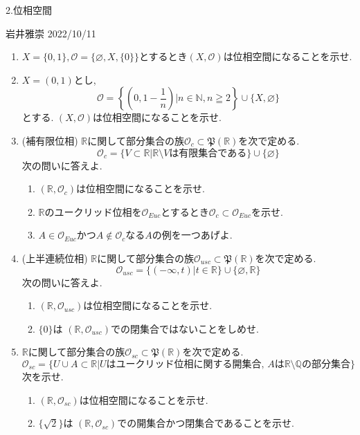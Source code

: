 \documentclass[dvipdfmx,a4paper,11pt]{article}
\newcommand{\R}{\mathbb{R}}
\newcommand{\Q}{\mathbb{Q}}
\newcommand{\N}{\mathbb{N}}
\theoremstyle{definition}
\begin{document}



\begin{center}
{\Large 2.位相空間}
\end{center}

\begin{flushright}
 岩井雅崇 2022/10/11
\end{flushright}
\begin{enumerate}[ label=\textbf{問}2.\arabic*]
\item $X = \{ 0,1\}, \mathscr{O} = \{ \varnothing, X, \{0\} \}$とするとき$(X, \mathscr{O})$は位相空間になることを示せ.

\item $X = (0,1)$とし, 
$$
\mathscr{O} = \left\{ \left(0,1 - \frac{1}{n}\right)| n \in \N, n \geqq 2 \right\} \cup \{ X,\varnothing \}
$$
とする. $(X, \mathscr{O})$は位相空間になることを示せ.

\item (補有限位相)
$\R$に関して部分集合の族$\mathscr{O}_c \subset \mathfrak{P}(\R)$を次で定める.
$$
\mathscr{O}_c = \{V \subset \R | \text{$\R \setminus V$は有限集合である} \} \cup \{  \varnothing  \}
$$
次の問いに答えよ.
	\begin{enumerate}
	\item $(\R,\mathscr{O}_c)$は位相空間になることを示せ.
	\item $\R$のユークリッド位相を$\mathscr{O}_{Euc}$とするとき$\mathscr{O}_c  \subset \mathscr{O}_{Euc}$を示せ. 
	\item $A \in \mathscr{O}_{Euc}$かつ$A \not \in \mathscr{O}_c$なる$A$の例を一つあげよ.
	\end{enumerate}
	
\item (上半連続位相) $\R$に関して部分集合の族$\mathscr{O}_{usc} \subset \mathfrak{P}(\R)$を次で定める.
$$
\mathscr{O}_{usc} = \{(- \infty,t) | t \in \R \} \cup \{  \varnothing , \R \}
$$
次の問いに答えよ.
	\begin{enumerate}
	\item $(\R,\mathscr{O}_{usc})$は位相空間になることを示せ.
	\item $\{ 0\}$は $(\R,\mathscr{O}_{usc})$での閉集合ではないことをしめせ. 
	\end{enumerate}
	
\item $\R$に関して部分集合の族$\mathscr{O}_{sc} \subset \mathfrak{P}(\R)$を次で定める.
$$
\mathscr{O}_{sc}  = \{U \cup A \subset \R | \text{$U$はユークリッド位相に関する開集合, $A$は$\R \setminus \Q$の部分集合}\}
$$
次を示せ.
	\begin{enumerate}
	\item $(\R,\mathscr{O}_{sc} )$は位相空間になることを示せ.
	\item $\{ \sqrt{2}\}$は $(\R,\mathscr{O}_{sc} )$での開集合かつ閉集合であることを示せ.
	\end{enumerate}
	

\end{enumerate}
\end{document}

